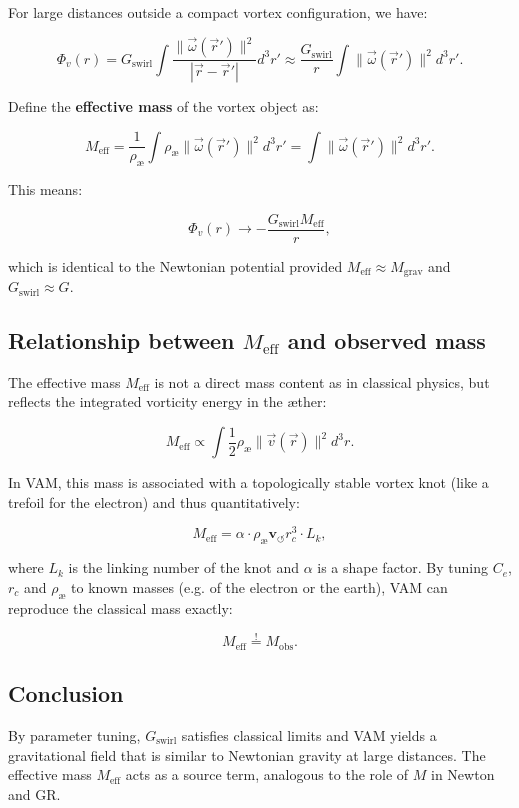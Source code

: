 For large distances outside a compact vortex configuration, we have:

\begin{equation}
  \Phi_v(r) = G_\text{swirl} \int \frac{\|\vec{\omega}(\vec{r}')\|^2}{|\vec{r} - \vec{r}'|} d^3r' \approx \frac{G_\text{swirl}}{r} \int \|\vec{\omega}(\vec{r}')\|^2 d^3r'.
\end{equation}

Define the \textbf{effective mass} of the vortex object as:

\begin{equation}
  M_\text{eff} = \frac{1}{\rho_\text{æ}} \int \rho_\text{æ} \|\vec{\omega}(\vec{r}')\|^2 d^3r' = \int \|\vec{\omega}(\vec{r}')\|^2 d^3r'.
\end{equation}

This means:

\begin{equation}
  \Phi_v(r) \to -\frac{G_\text{swirl} M_\text{eff}}{r},
\end{equation}

which is identical to the Newtonian potential provided $M_\text{eff} \approx M_\text{grav}$ and $G_\text{swirl} \approx G$.

\subsection{Relationship between $M_\text{eff}$ and observed mass}

The effective mass $M_\text{eff}$ is not a direct mass content as in classical physics, but reflects the integrated vorticity energy in the æther:

\begin{equation}
  M_\text{eff} \propto \int \frac{1}{2} \rho_\text{æ} \|\vec{v}(\vec{r})\|^2 d^3r.
\end{equation}

In VAM, this mass is associated with a topologically stable vortex knot (like a trefoil for the electron) and thus quantitatively:

\begin{equation}
  M_\text{eff} = \alpha \cdot \rho_\text{æ} \mathbf{v}_{\scriptscriptstyle\boldsymbol{\circlearrowleft}} r_c^3 \cdot L_k,
\end{equation}

where $L_k$ is the linking number of the knot and $\alpha$ is a shape factor. By tuning $C_e$, $r_c$ and $\rho_\text{æ}$ to known masses (e.g. of the electron or the earth), VAM can reproduce the classical mass exactly:

\begin{equation}
  M_\text{eff} \overset{!}{=} M_\text{obs}.
\end{equation}

\subsection{Conclusion}

By parameter tuning, $G_\text{swirl}$ satisfies classical limits and VAM yields a gravitational field that is similar to Newtonian gravity at large distances. The effective mass $M_\text{eff}$ acts as a source term, analogous to the role of $M$ in Newton and GR.